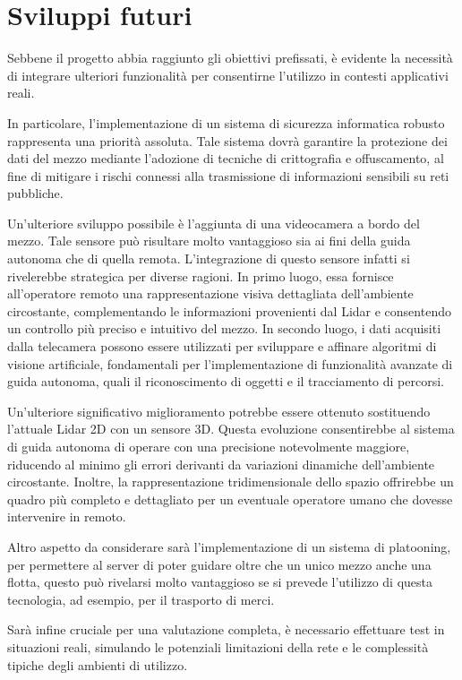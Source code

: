 \section{Sviluppi futuri}
Sebbene il progetto abbia raggiunto gli obiettivi prefissati, è evidente la necessità di integrare ulteriori funzionalità per consentirne l'utilizzo in contesti applicativi reali. 

\noindent In particolare, l'implementazione di un sistema di sicurezza informatica robusto rappresenta una priorità assoluta. Tale sistema dovrà garantire la protezione dei dati del mezzo mediante l'adozione di tecniche di crittografia e offuscamento, al fine di mitigare i rischi connessi alla trasmissione di informazioni sensibili su reti pubbliche.

\noindent Un'ulteriore sviluppo possibile è l'aggiunta di una videocamera a bordo del mezzo. Tale sensore può risultare molto vantaggioso sia ai fini della guida autonoma che di quella remota. L'integrazione di questo sensore infatti si rivelerebbe strategica per diverse ragioni. In primo luogo, essa fornisce all'operatore remoto una rappresentazione visiva dettagliata dell'ambiente circostante, complementando le informazioni provenienti dal Lidar e consentendo un controllo più preciso e intuitivo del mezzo. In secondo luogo, i dati acquisiti dalla telecamera possono essere utilizzati per sviluppare e affinare algoritmi di visione artificiale, fondamentali per l'implementazione di funzionalità avanzate di guida autonoma, quali il riconoscimento di oggetti e il tracciamento di percorsi. 

\noindent Un'ulteriore significativo miglioramento potrebbe essere ottenuto sostituendo l'attuale Lidar 2D con un sensore 3D. Questa evoluzione consentirebbe al sistema di guida autonoma di operare con una precisione notevolmente maggiore, riducendo al minimo gli errori derivanti da variazioni dinamiche dell'ambiente circostante. Inoltre, la rappresentazione tridimensionale dello spazio offrirebbe un quadro più completo e dettagliato per un eventuale operatore umano che dovesse intervenire in remoto.

\noindent Altro aspetto da considerare sarà l'implementazione di un sistema di platooning, per permettere al  server di poter guidare oltre che un unico mezzo anche una flotta, questo può rivelarsi molto vantaggioso se si prevede l'utilizzo di questa tecnologia, ad esempio, per il trasporto di merci.

\noindent Sarà infine cruciale per una valutazione completa, è necessario effettuare test in situazioni reali, simulando le potenziali limitazioni della rete e le complessità tipiche degli ambienti di utilizzo.

